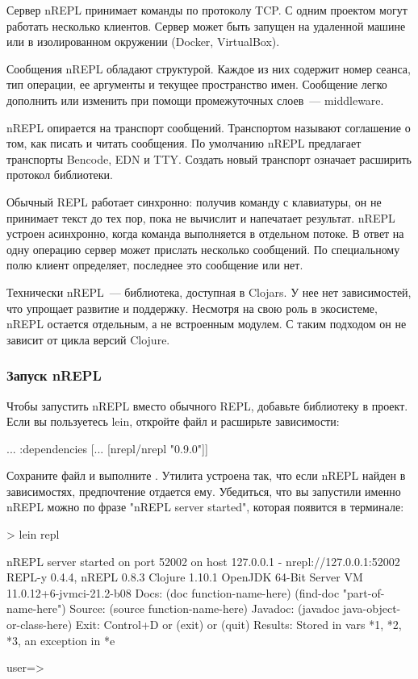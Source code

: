 Сервер nREPL принимает команды по протоколу TCP. С одним проектом могут работать несколько клиентов. Сервер может быть запущен на удаленной машине или в изолированном окружении (Docker, VirtualBox).

Сообщения nREPL обладают структурой. Каждое из них содержит номер сеанса, тип операции, ее аргументы и текущее пространство имен. Сообщение легко дополнить или изменить при помощи промежуточных слоев~--- middleware.

nREPL опирается на транспорт сообщений. Транспортом называют соглашение о том, как писать и читать сообщения. По умолчанию nREPL предлагает транспорты Bencode, EDN и TTY. Создать новый транспорт означает расширить протокол библиотеки.

Обычный REPL работает синхронно: получив команду с клавиатуры, он не принимает текст до тех пор, пока не вычислит и напечатает результат. nREPL устроен асинхронно, когда команда выполняется в отдельном потоке. В ответ на одну операцию сервер может прислать несколько сообщений. По специальному полю клиент определяет, последнее это сообщение или нет.

Технически nREPL~--- библиотека, доступная в Clojars. У нее нет зависимостей, что упрощает развитие и поддержку. Несмотря на свою роль в экосистеме, nREPL остается отдельным, а не встроенным модулем. С таким подходом он не зависит от цикла версий Clojure.

\subsubsection{Запуск nREPL}

Чтобы запустить nREPL вместо обычного REPL, добавьте библиотеку в проект. Если вы пользуетесь lein, откройте файл  и расширьте зависимости:

\begin{english}
  \begin{clojure}
{...
 :dependencies
 [... [nrepl/nrepl "0.9.0"]]}
  \end{clojure}
\end{english}

Сохраните файл и выполните . Утилита  устроена так, что если nREPL найден в зависимостях, предпочтение отдается ему. Убедиться, что вы запустили именно nREPL можно по фразе "nREPL server started", которая появится в терминале:

\begin{english}
  \begin{text}
> lein repl

nREPL server started on port 52002 on host 127.0.0.1 - nrepl://127.0.0.1:52002
REPL-y 0.4.4, nREPL 0.8.3
Clojure 1.10.1
OpenJDK 64-Bit Server VM 11.0.12+6-jvmci-21.2-b08
    Docs: (doc function-name-here)
          (find-doc "part-of-name-here")
  Source: (source function-name-here)
 Javadoc: (javadoc java-object-or-class-here)
    Exit: Control+D or (exit) or (quit)
 Results: Stored in vars *1, *2, *3, an exception in *e

user=>
  \end{text}
\end{english}

